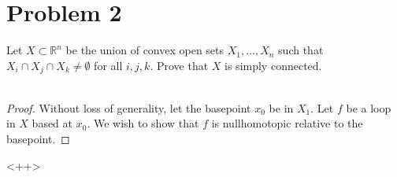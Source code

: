 \documentclass[fontsize=11pt]{scrartcl} %
\numberwithin{equation}{section} %
\numberwithin{figure}{section} %
\numberwithin{table}{section} %
\newcommand{\R}{\mathbb{R}}
\begin{document}
\newpage

\section*{Problem 2}
Let $X\subset \R^n$ be the union of convex open sets $X_1,\dots,X_n$ such that
$X_i\cap X_j\cap X_k\neq\emptyset$ for all $i,j,k$. Prove that $X$ is simply
connected.
\\
\\
\begin{proof}
    Without loss of generality, let the basepoint $x_0$ be in $X_1$. Let $f$ be
    a loop in $X$ based at $x_0$. We wish to show that $f$ is nullhomotopic
    relative to the basepoint.


\end{proof}<++>
\end{document}
